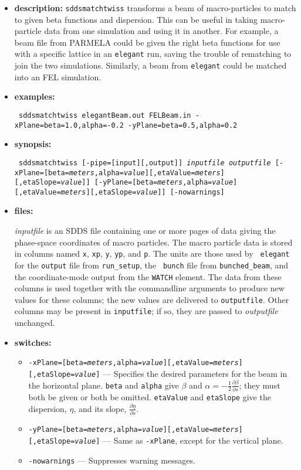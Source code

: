 \documentclass[11pt]{article}
\begin{document}
\begin{itemize}
\item {\bf description:} 
{\tt sddsmatchtwiss} transforms a beam of macro-particles to match to given beta
functions and dispersion.   This can be useful in taking macro-particle data from
one simulation and using it in another.  For example, a beam file from PARMELA
could be given the right beta functions for use with a specific lattice in an
{\tt elegant} run, saving the trouble of rematching to join the two simulations.
Similarly, a beam from {\tt elegant} could be matched into an FEL simulation.

\item {\bf examples:}
\begin{flushleft}{\tt
sddsmatchtwiss elegantBeam.out FELBeam.in -xPlane=beta=1.0,alpha=-0.2 -yPlane=beta=0.5,alpha=0.2
}\end{flushleft}

\item {\bf synopsis:}
\begin{flushleft}{\tt
sddsmatchtwiss [-pipe=[input][,output]] {\em inputfile} {\em outputfile}
[-xPlane=[beta={\em meters},alpha={\em value}][,etaValue={\em meters}][,etaSlope={\em value}]]
[-yPlane=[beta={\em meters},alpha={\em value}][,etaValue={\em meters}][,etaSlope={\em value}]]
[-nowarnings]
}\end{flushleft}

\item {\bf files:}

{\em inputfile} is an SDDS file containing one or more pages of data
giving the phase-space coordinates of macro particles.  The macro
particle data is stored in columns named \verb|x|, \verb|xp|,
\verb|y|, \verb|yp|, and \verb|p|.  The units are those used by {\tt
elegant} for the {\tt output} file from {\tt run\_setup}, the {\tt
bunch} file from {\tt bunched\_beam}, and the coordinate-mode output
from the {\tt WATCH} element. The data from these columns is used
together with the commandline arguments to produce new values for
these columns; the new values are delivered to {\tt outputfile}.
Other columns may be present in {\tt inputfile}; if so, they are
passed to {\em outputfile} unchanged.

\item {\bf switches:}
\begin{itemize}
\item {\tt -xPlane=[beta={\em meters},alpha={\em value}][,etaValue={\em meters}][,etaSlope={\em value}]} ---
        Specifies the desired parameters for the beam in the horizontal plane.  {\tt beta} and {\tt alpha} give
        $\beta$ and $\alpha = -\frac{1}{2}\frac{\partial \beta}{\partial s}$; they must both be given
        or both be omitted.  {\tt etaValue} and {\tt etaSlope} give the dispersion, $\eta$, and 
        its slope, $\frac{\partial \eta}{\partial s}$.
\item {\tt -yPlane=[beta={\em meters},alpha={\em value}][,etaValue={\em meters}][,etaSlope={\em value}]} ---
        Same as {\tt -xPlane}, except for the vertical plane.
\item {\tt -nowarnings} --- Suppresses warning messages.
\end{itemize}


\end{itemize}
\end{document}
